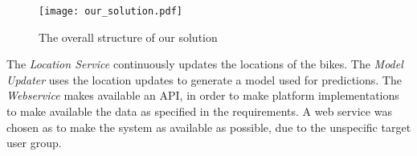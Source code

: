 \begin{figure}[h]
\texttt{[image: our\_solution.pdf]}
\caption{The overall structure of our solution}
\label{fig:solution_structure}
\end{figure}

The \textit{Location Service} continuously updates the locations of the bikes.
The \textit{Model Updater} uses the location updates to generate a model used for predictions.
The \textit{Webservice} makes available an API, in order to make platform implementations to make available the data as specified in the requirements.
A web service was chosen as to make the system as available as possible, due to the unspecific target user group.